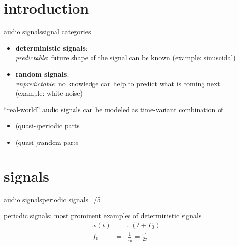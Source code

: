    \section[intro]{introduction}
        \begin{frame}{audio signals}{signal categories}
            \begin{itemize}
                \item	\textbf{deterministic signals}:\\
                        \textit{predictable}: future shape of the signal can be known (example: sinusoidal)
                \pause		
                \item	\textbf{random signals}:\\
                        \textit{unpredictable}: no knowledge can help to predict what is coming next (example: white noise)
            \end{itemize}
            
            \bigskip
            \pause
            ``real-world'' audio signals can be modeled as time-variant combination of 
            \begin{itemize}
                \item	(quasi-)periodic parts
                \item	(quasi-)random parts
            \end{itemize}
        \end{frame}

    \section[signals]{signals}
        \begin{frame}{audio signals}{periodic signals 1/5}

            periodic signals: most prominent examples of deterministic signals
            \begin{eqnarray*}
                x(t) 	&=& x(t+T_0)\\
                f_0 	&=& \frac{1}{T_0} =  \frac{\omega_0}{2\pi}
            \end{eqnarray*}

        \end{frame}

